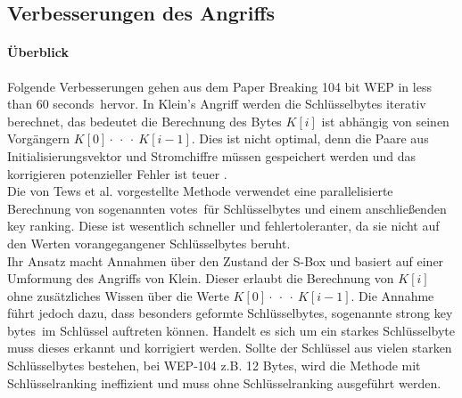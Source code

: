\documentclass[10pt,a4paper]{article}
\begin{document}
\subsection{Verbesserungen des Angriffs}
\paragraph{Überblick}
Folgende Verbesserungen gehen aus dem Paper \glqq Breaking 104 bit WEP in less than 60 seconds\grqq \cite{TWP07}\ hervor.
In Klein's Angriff werden die Schlüsselbytes iterativ berechnet, das bedeutet die Berechnung des Bytes $K[i]$ ist abhängig von seinen Vorgängern $K[0] \cdot\ \cdot\ \cdot\ K[i-1]$. Dies ist nicht optimal, denn die Paare aus Initialisierungsvektor und Stromchiffre müssen gespeichert werden und das korrigieren potenzieller Fehler ist teuer \cite[Kapitel 4]{TWP07}.\\ Die von Tews et al. vorgestellte Methode verwendet eine parallelisierte Berechnung von sogenannten \glqq votes\grqq\ für Schlüsselbytes und einem anschließenden \glqq key ranking\grqq. Diese ist wesentlich schneller und fehlertoleranter, da sie nicht auf den Werten vorangegangener Schlüsselbytes beruht.\\Ihr Ansatz macht Annahmen über den Zustand der S-Box und basiert auf einer Umformung des Angriffs von Klein. Dieser erlaubt die Berechnung von $K[i]$ ohne zusätzliches Wissen über die Werte $K[0] \cdot\ \cdot\ \cdot\ K[i-1]$. Die Annahme führt jedoch dazu, dass besonders geformte Schlüsselbytes, sogenannte \glqq strong key bytes\grqq\ im Schlüssel auftreten können. Handelt es sich um ein starkes Schlüsselbyte muss dieses erkannt und korrigiert werden. Sollte der Schlüssel aus vielen starken Schlüsselbytes bestehen, bei WEP-104 z.B. 12 Bytes, wird die Methode mit Schlüsselranking ineffizient und muss ohne Schlüsselranking ausgeführt werden.
\end{document}
